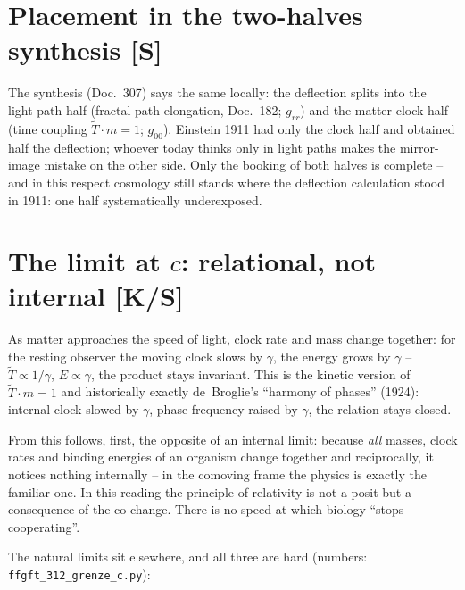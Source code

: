 \documentclass[11pt]{report}
\begin{document}
\section{Placement in the two-halves synthesis [S]}

The synthesis (Doc.~307) says the same locally: the deflection
splits into the light-path half (fractal path elongation,
Doc.~182; $g_{rr}$) and the matter-clock half (time coupling
$\tilde T \cdot m = 1$; $g_{00}$). Einstein 1911 had only the
clock half and obtained half the deflection; whoever today thinks
only in light paths makes the mirror-image mistake on the other
side. Only the booking of both halves is complete -- and in this
respect cosmology still stands where the deflection calculation
stood in 1911: one half systematically underexposed.

\section{The limit at $c$: relational, not internal [K/S]}

As matter approaches the speed of light, clock rate and mass change
together: for the resting observer the moving clock slows by
$\gamma$, the energy grows by $\gamma$ --
$\tilde T \propto 1/\gamma$, $E \propto \gamma$, the product stays
invariant. This is the kinetic version of $\tilde T \cdot m = 1$
and historically exactly de~Broglie's \enquote{harmony of phases}
(1924): internal clock slowed by $\gamma$, phase frequency raised
by $\gamma$, the relation stays closed.

From this follows, first, the opposite of an internal limit:
because \emph{all} masses, clock rates and binding energies of an
organism change together and reciprocally, it notices nothing
internally -- in the comoving frame the physics is exactly the
familiar one. In this reading the principle of relativity is not a
posit but a consequence of the co-change. There is no speed at
which biology \enquote{stops cooperating}.

The natural limits sit elsewhere, and all three are hard (numbers:
\texttt{ffgft\_312\_grenze\_c.py}):
\end{document}
